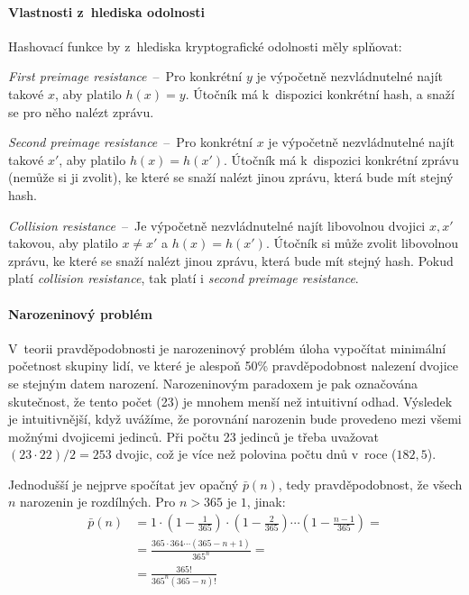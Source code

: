 \paragraph*{Vlastnosti z~hlediska odolnosti} Hashovací funkce by z~hlediska kryptografické odolnosti měly splňovat: \begin{compactitem}
    \item \textit{First preimage resistance}~--~Pro konkrétní $y$ je výpočetně nezvládnutelné najít takové $x$, aby platilo $h(x) = y$. Útočník má k~dispozici konkrétní hash, a snaží se pro něho nalézt zprávu.
    \item \textit{Second preimage resistance}~--~Pro konkrétní $x$ je výpočetně nezvládnutelné najít takové $x'$, aby platilo $h(x) = h(x')$. Útočník má k~dispozici konkrétní zprávu (nemůže si ji zvolit), ke které se snaží nalézt jinou zprávu, která bude mít stejný hash.
    \item \textit{Collision resistance}~--~Je výpočetně nezvládnutelné najít libovolnou dvojici $x, x'$ takovou, aby platilo $x \neq x'$ a $h(x) = h(x')$. Útočník si může zvolit libovolnou zprávu, ke které se snaží nalézt jinou zprávu, která bude mít stejný hash. Pokud platí \textit{collision resistance}, tak platí i \textit{second preimage resistance}.
\end{compactitem}

\paragraph*{Narozeninový problém} V~teorii pravděpodobnosti je narozeninový problém úloha vypočítat minimální početnost skupiny lidí, ve které je alespoň 50\% pravděpodobnost nalezení dvojice se stejným datem narození. Narozeninovým paradoxem je pak označována skutečnost, že tento počet (23) je mnohem menší než intuitivní odhad.
Výsledek je intuitivnější, když uvážíme, že porovnání narozenin bude provedeno mezi všemi možnými dvojicemi jedinců. Při počtu 23 jedinců je třeba uvažovat $(23 \cdot 22) / 2 = 253$ dvojic, což je více než polovina počtu dnů v~roce ($182,5$).

Jednodušší je nejprve spočítat jev opačný $\bar p(n)$, tedy pravděpodobnost, že všech $n$ narozenin je rozdílných. Pro $n > 365$ je $1$, jinak:
\begin{equation}
\begin{aligned}
\bar p(n) &= 1 \cdot \left(1-\frac{1}{365}\right) \cdot \left(1-\frac{2}{365}\right) \cdots \left(1-\frac{n-1}{365}\right) = \\
&=  \frac{365 \cdot 364 \cdots (365-n+1)}{365^n} = \\
&=  \frac{365!}{365^n (365-n)!}
\end{aligned}
\end{equation}

